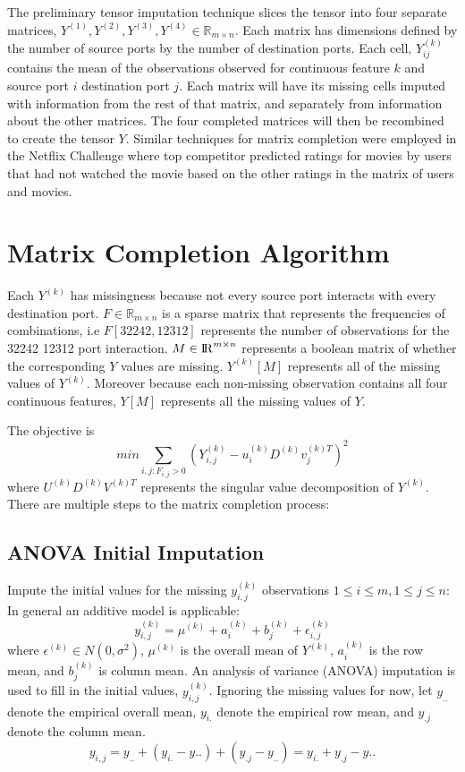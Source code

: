 \documentclass[12pt,twoside]{dukestatscithesis}
\theoremstyle{definition}
\theoremstyle{definition}
\theoremstyle{definition}
\theoremstyle{remark}
\begin{document}
The preliminary tensor imputation technique slices the tensor into four
separate matrices,
\(Y^{(1)}, Y^{(2)}, Y^{(3)}, Y^{(4)} \in \mathbb{R}_{m \times n}\). Each
matrix has dimensions defined by the number of source ports by the
number of destination ports. Each cell, \(Y^{(k)}_{ij}\) contains the
mean of the observations observed for continuous feature \(k\) and
source port \(i\) destination port \(j\). Each matrix will have its
missing cells imputed with information from the rest of that matrix, and
separately from information about the other matrices. The four completed
matrices will then be recombined to create the tensor \(Y\). Similar
techniques for matrix completion were employed in the Netflix Challenge
where top competitor predicted ratings for movies by users that had not
watched the movie based on the other ratings in the matrix of users and
movies.

\section{Matrix Completion Algorithm}\label{matrix-completion-algorithm}

Each \(Y^{(k)}\) has missingness because not every source port interacts
with every destination port. \(F \in \mathbb{R}_{m \times n}\) is a
sparse matrix that represents the frequencies of combinations, i.e
\(F[32242,12312]\) represents the number of observations for the 32242
12312 port interaction. \(M \in {\rm I\!R}^{m \times n}\) represents a
boolean matrix of whether the corresponding \(Y\) values are missing.
\(Y^{(k)}[M]\) represents all of the missing values of \(Y^{(k)}\).
Moreover because each non-missing observation contains all four
continuous features, \(Y[M]\) represents all the missing values of
\(Y\).

The objective is
\[min \sum_{i,j:F_{i,j} > 0} (Y^{(k)}_{i,j} - u^{(k)}_iD^{(k)}v^{(k)T}_j)^2\]
where \(U^{(k)}D^{(k)}V^{(k)T}\) represents the singular value
decomposition of \(Y^{(k)}\). There are multiple steps to the matrix
completion process:

\subsection{ANOVA Initial Imputation}\label{anova-initial-imputation}

Impute the initial values for the missing \(y^{(k)}_{i,j}\) observations
\(1 \leq i \leq m, 1 \leq j \leq n\): In general an additive model is
applicable:
\[y^{(k)}_{i,j} = \mu^{(k)} + a^{(k)}_i + b^{(k)}_j + \epsilon^{(k)}_{i,j}\]
where \(\epsilon^{(k)} \in N(0,\sigma^2)\), \(\mu^{(k)}\) is the overall
mean of \(Y^{(k)}\), \(a^{(k)}_i\) is the row mean, and \(b^{(k)}_j\) is
column mean. An analysis of variance (ANOVA) imputation is used to fill
in the initial values, \(y^{(k)}_{i,j}\). Ignoring the missing values
for now, let \(y_{..}\) denote the empirical overall mean, \(y_{i.}\)
denote the empirical row mean, and \(y_{.j}\) denote the column mean.
\[y_{i,j} = y_{..} + (y_{i.}-y{..}) + (y_{.j}-y_{..}) = y_{i.} + y_{.j} - y{..}\]
\end{document}
